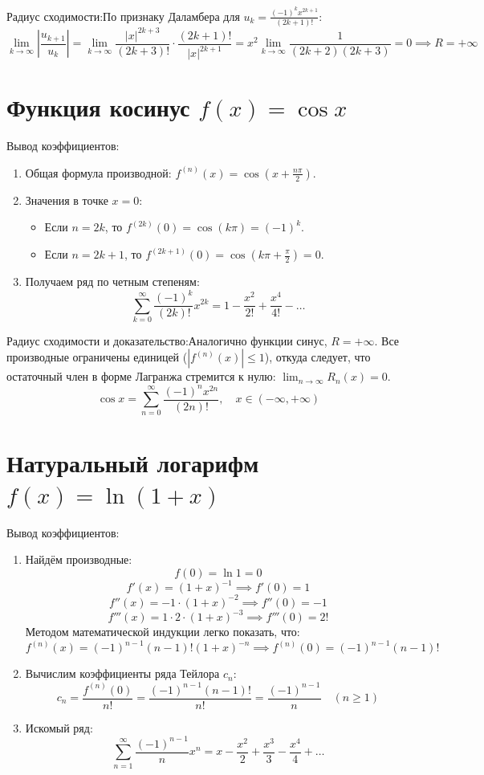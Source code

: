 \documentclass[14pt]{extreport}
\begin{document}
    Радиус сходимости:По признаку Даламбера для $u_k = \frac{(-1)^k x^{2k+1}}{(2k+1)!}$:$$\lim_{k \to \infty} \left| \frac{u_{k+1}}{u_k} \right| = \lim_{k \to \infty} \frac{|x|^{2k+3}}{(2k+3)!} \cdot \frac{(2k+1)!}{|x|^{2k+1}} = x^2 \lim_{k \to \infty} \frac{1}{(2k+2)(2k+3)} = 0 \implies R = +\infty$$


    \section{Функция косинус $f(x) = \cos x$}

    Вывод коэффициентов:
    \begin{enumerate}
        \item Общая формула производной: $f^{(n)}(x) = \cos\left(x + \frac{n\pi}{2}\right)$.
        \item Значения в точке $x = 0$:
        \begin{itemize}
            \item Если $n = 2k$, то $f^{(2k)}(0) = \cos(k\pi) = (-1)^k$.
            \item Если $n = 2k+1$, то $f^{(2k+1)}(0) = \cos\left(k\pi + \frac{\pi}{2}\right) = 0$.
        \end{itemize}
        \item Получаем ряд по четным степеням:$$\sum_{k=0}^{\infty} \frac{(-1)^k}{(2k)!} x^{2k} = 1 - \frac{x^2}{2!} + \frac{x^4}{4!} - \dots$$
    \end{enumerate}

    Радиус сходимости и доказательство:Аналогично функции синус, $R = +\infty$. Все производные ограничены единицей ($|f^{(n)}(x)| \le 1$), откуда следует, что остаточный член в форме Лагранжа стремится к нулю: $\lim_{n \to \infty} R_n(x) = 0$.$$\cos x = \sum_{n=0}^{\infty} \frac{(-1)^n x^{2n}}{(2n)!}, \quad x \in (-\infty, +\infty)$$


    \section{Натуральный логарифм $f(x) = \ln(1 + x)$}

    Вывод коэффициентов:
    \begin{enumerate}
        \item Найдём производные:
        $$f(0) = \ln 1 = 0$$$$f'(x) = (1+x)^{-1} \implies f'(0) = 1$$$$f''(x) = -1 \cdot (1+x)^{-2} \implies f''(0) = -1$$$$f'''(x) = 1 \cdot 2 \cdot (1+x)^{-3} \implies f'''(0) = 2!$$
        Методом математической индукции легко показать, что:$$f^{(n)}(x) = (-1)^{n-1} (n-1)! (1+x)^{-n} \implies f^{(n)}(0) = (-1)^{n-1} (n-1)!$$
        \item Вычислим коэффициенты ряда Тейлора $c_n$:$$c_n = \frac{f^{(n)}(0)}{n!} = \frac{(-1)^{n-1}(n-1)!}{n!} = \frac{(-1)^{n-1}}{n} \quad (n \ge 1)$$
        \item Искомый ряд:$$\sum_{n=1}^{\infty} \frac{(-1)^{n-1}}{n} x^n = x - \frac{x^2}{2} + \frac{x^3}{3} - \frac{x^4}{4} + \dots$$
    \end{enumerate}
\end{document}
